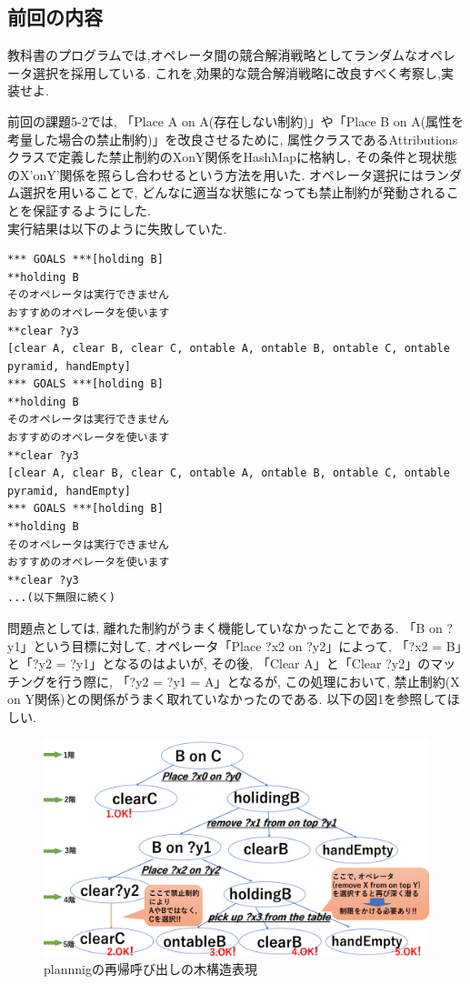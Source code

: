 \documentclass[12pt]{jarticle}
\begin{document}
\subsection{前回の内容}
\begin{screen}
教科書のプログラムでは,オペレータ間の競合解消戦略としてランダムなオペレータ選択を採用している.
これを,効果的な競合解消戦略に改良すべく考察し,実装せよ.
\end{screen}
前回の課題5-2では, 「Place A on A(存在しない制約)」や「Place B on A(属性を考量した場合の禁止制約)」を改良させるために, 属性クラスであるAttributionsクラスで定義した禁止制約のXonY関係をHashMapに格納し, その条件と現状態のX'onY'関係を照らし合わせるという方法を用いた. オペレータ選択にはランダム選択を用いることで, どんなに適当な状態になっても禁止制約が発動されることを保証するようにした. \\

実行結果は以下のように失敗していた.
\begin{lstlisting}[caption=失敗実行例その1, label=src:No1]
*** GOALS ***[holding B]
**holding B
そのオペレータは実行できません
おすすめのオペレータを使います
**clear ?y3
[clear A, clear B, clear C, ontable A, ontable B, ontable C, ontable pyramid, handEmpty]
*** GOALS ***[holding B]
**holding B
そのオペレータは実行できません
おすすめのオペレータを使います
**clear ?y3
[clear A, clear B, clear C, ontable A, ontable B, ontable C, ontable pyramid, handEmpty]
*** GOALS ***[holding B]
**holding B
そのオペレータは実行できません
おすすめのオペレータを使います
**clear ?y3
...(以下無限に続く)
\end{lstlisting}

問題点としては, 離れた制約がうまく機能していなかったことである. 「B on ?y1」という目標に対して, オペレータ「Place ?x2 on ?y2」によって, 「?x2 = B」と「?y2 = ?y1」となるのはよいが, その後, 「Clear A」と「Clear ?y2」のマッチングを行う際に, 「?y2 = ?y1 = A」となるが, この処理において, 禁止制約(X on Y関係)との関係がうまく取れていなかったのである. 以下の図1を参照してほしい.

\begin{figure}[htbp]
 \begin{center}
  \includegraphics[width = 12cm, pagebox = cropbox, clip]{images/treeContsraction.pdf}
 \end{center}
 \caption[]{plannnigの再帰呼び出しの木構造表現}\label{fig:fig1.1}
\end{figure}
\end{document}
